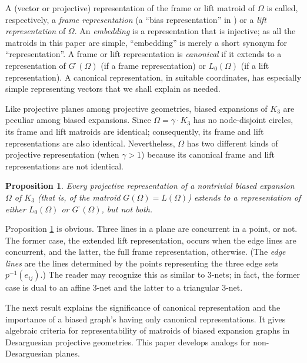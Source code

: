 \documentclass[reqno,12pt]{amsart}
\newtheorem{prop}[thm]{Proposition}
\theoremstyle{remark}
\numberwithin{equation}{section}
\numberwithin{figure}{section}
\newcommand \inv{^{-1}}
\newcommand \full{^{{}^{{}_{{}_\bullet}}\!}}
\newcommand\G{{G\full}}
\begin{document}
A (vector or projective) representation of the frame or lift matroid of $\Omega$ is called, respectively, a \emph{frame representation} (a ``bias representation'' in \cite[Part IV]{BG}) or a \emph{lift representation} of $\Omega$.  An \emph{embedding} is a representation that is injective; as all the matroids in this paper are simple, ``embedding'' is merely a short synonym for ``representation''.  
A frame or lift representation is \emph{canonical} if it extends to a representation of $\G(\Omega)$ (if a frame representation) or $L_0(\Omega)$ (if a lift representation).  A canonical representation, in suitable coordinates, has especially simple representing vectors \cite[Sections IV.2.1 and IV.4.1]{BG} that we shall explain as needed.  

Like projective planes among projective geometries, biased expansions of $K_3$ are peculiar among biased expansions.  Since $\Omega=\gamma\cdot K_3$ has no node-disjoint circles, its frame and lift matroids are identical; consequently, its frame and lift representations are also identical.  Nevertheless, $\Omega$ has two different kinds of projective representation (when $\gamma>1$) because its canonical frame and lift representations are not identical.  

\begin{prop}\label{L:canonical}
Every projective representation of a nontrivial biased expansion $\Omega$ of $K_3$ (that is, of the matroid $G(\Omega) = L(\Omega)$) extends to a representation of either $L_0(\Omega)$ or $\G(\Omega)$, but not both.  
\end{prop}

Proposition \ref{L:canonical} is obvious.  Three lines in a plane are concurrent in a point, or not.  
The former case, the extended lift representation, occurs when the edge lines are concurrent, and the latter, the full frame representation, otherwise.  (The \emph{edge lines} are the lines determined by the points representing the three edge sets $p\inv(e_{ij})$.)  The reader may recognize this as similar to $3$-nets; in fact, the former case is dual to an affine $3$-net and the latter to a triangular $3$-net.  

The next result explains the significance of canonical representation and the importance of a biased graph's having only canonical representations.  It gives algebraic criteria for representability of matroids of biased expansion graphs in Desarguesian projective geometries.  This paper develops analogs for non-Desarguesian planes.
\end{document}
